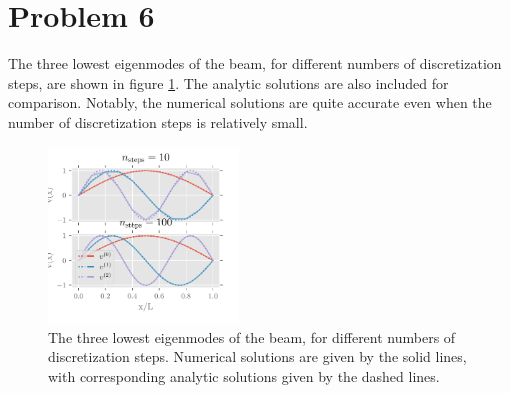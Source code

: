\documentclass[english,notitlepage,reprint,nofootinbib]{revtex4-2}  %
\begin{document}
\section{Problem 6}
The three lowest eigenmodes of the beam, for different numbers of discretization steps, are shown in figure \ref{fig:eigenvectors}. 
The analytic solutions are also included for comparison.
Notably, the numerical solutions are quite accurate even when the number of discretization steps is relatively small.
\begin{figure}
    \centering
    \includegraphics[width=0.45\textwidth]{Code/output/eigenvectors.pdf}
    \caption{The three lowest eigenmodes of the beam, for different numbers of discretization steps.
    Numerical solutions are given by the solid lines, with corresponding analytic solutions given by the dashed lines.}
    \label{fig:eigenvectors}
\end{figure}


\onecolumngrid
% 


\end{document}
